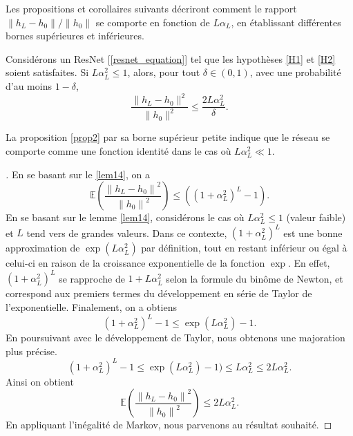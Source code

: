 Les propositions et corollaires suivants décriront comment le rapport ${\left\| h_L - h_0 \right\|} / {\left\| h_0 \right\|}$ se comporte en fonction de $L\alpha_L$, en établissant différentes bornes supérieures et inférieures.


\begin{proposition}\label{prop2}
    Considérons un ResNet [\ref{resnet_equation}] tel que les hypothèses \ref{H1} et \ref{H2} soient satisfaites.
    Si \( L\alpha_L^2 \leq 1 \), alors, pour tout \( \delta \in (0, 1) \), avec une probabilité d'au moins \( 1 - \delta \),
    \[
        \frac{\|h_L - h_0\|^2}{\|h_0\|^2} \leq \frac{2L\alpha_L^2}{\delta}
    .\]
\end{proposition}
La proposition \ref{prop2} par sa borne supérieur petite indique que le réseau se comporte comme une fonction identité dans le cas où $ L \alpha ^2 _L \ll 1 $.

\begin{proof}[]
    En se basant sur le \cref{lem14}, on a 
    \[
        \mathbb{E}( \frac{\left\| h_L - h_0 \right\| ^2 }{\left\| h_0 \right\| ^2}) \leq ((1 + \alpha _L ^2 ) ^L - 1 )
    .\]
    En se basant sur le lemme \ref{lem14}, considérons le cas où $L \alpha_L^2 \leq 1$ (valeur faible) et $L$ tend vers de grandes valeurs. Dans ce contexte, $(1 + \alpha_L^2)^L$ est une bonne approximation de $\exp(L \alpha_L^2)$ par définition, tout en restant inférieur ou égal à celui-ci en raison de la croissance exponentielle de la fonction $\exp$. En effet, $(1 + \alpha_L^2)^L$ se rapproche de $1 + L \alpha_L^2$ selon la formule du binôme de Newton, et correspond aux premiers termes du développement en série de Taylor de l'exponentielle. Finalement, on a obtiens
    \[
        (1 + \alpha _L ^2)^L -1 \leq \exp (L \alpha _L ^2) - 1
    .\]
    En poursuivant avec le développement de Taylor, nous obtenons une majoration plus précise.
    \[
        (1 + \alpha _L ^2)^L -1 \leq \exp (L \alpha _L ^2) - 1) \leq L \alpha _L ^2 \leq 2 L \alpha _L ^2
    .\]
    Ainsi on obtient 
    \[
        \mathbb{E}( \frac{\left\| h_L - h_0 \right\| ^2 }{\left\| h_0 \right\| ^2}) \leq 2 L \alpha _L ^2
    .\]
    En appliquant l'inégalité de Markov, nous parvenons au résultat souhaité.
\end{proof}



